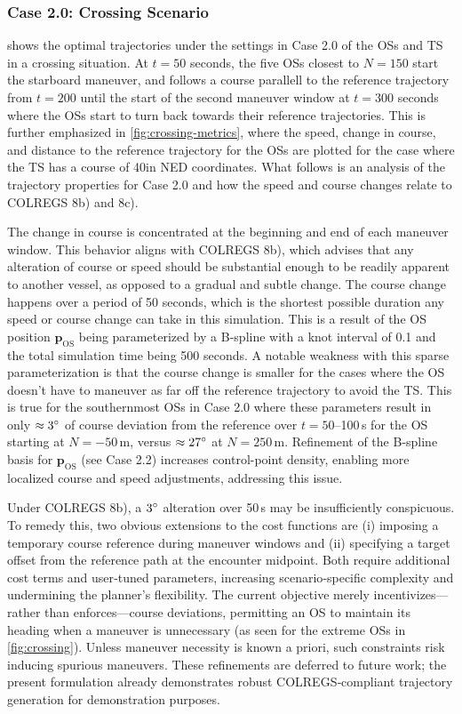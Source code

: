 \subsubsection{Case 2.0: Crossing Scenario}
 shows the optimal trajectories under the settings in Case 2.0 of the OSs and TS in a crossing situation. At $t=50$ seconds, the five OSs closest to $N=150$ start the starboard maneuver, and follows a course parallell to the reference trajectory from $t=200$ until the start of the second maneuver window at $t=300$ seconds where the OSs start to turn back towards their reference trajectories. This is further emphasized in \cref{fig:crossing-metrics}, where the speed, change in course, and distance to the reference trajectory for the OSs are plotted for the case where the TS has a course of 40\degree in \gls{NED} coordinates. What follows is an analysis of the trajectory properties for Case 2.0 and how the speed and course changes relate to COLREGS 8b) and 8c).

The change in course is concentrated at the beginning and end of each maneuver window. This behavior aligns with COLREGS 8b), which advises that any alteration of course or speed should be substantial enough to be readily apparent to another vessel, as opposed to a gradual and subtle change.  The course change happens over a period of 50 seconds, which is the shortest possible duration any speed or course change can take in this simulation. This is a result of the OS position $\mathbf p_\text{OS}$ being parameterized by a B-spline with a knot interval of 0.1 and the total simulation time being 500 seconds. A notable weakness with this sparse parameterization is that the course change is smaller for the cases where the OS doesn't have to maneuver as far off the reference trajectory to avoid the TS. 
This is true for the southernmost OSs in Case 2.0 where these parameters result in only $\approx3\degree$ of course deviation from the reference over $t=50$–100\,s for the OS starting at $N=-50\,$m, versus $\approx27\degree$ at $N=250\,$m. Refinement of the B-spline basis for $\mathbf p_\text{OS}$ (see Case 2.2) increases control-point density, enabling more localized course and speed adjustments, addressing this issue.

Under COLREGS 8b), a $3\degree$ alteration over 50\,s  may be insufficiently conspicuous. To remedy this, two obvious extensions to the cost functions are (i) imposing a temporary course reference during maneuver windows and (ii) specifying a target offset from the reference path at the encounter midpoint. Both require additional cost terms and user‐tuned parameters, increasing scenario‐specific complexity and undermining the planner’s flexibility. The current objective merely incentivizes---rather than enforces---course deviations, permitting an OS to maintain its heading when a maneuver is unnecessary (as seen for the extreme OSs in \cref{fig:crossing}). Unless maneuver necessity is known a priori, such constraints risk inducing spurious maneuvers. These refinements are deferred to future work; the present formulation already demonstrates robust COLREGS‐compliant trajectory generation for demonstration purposes.


